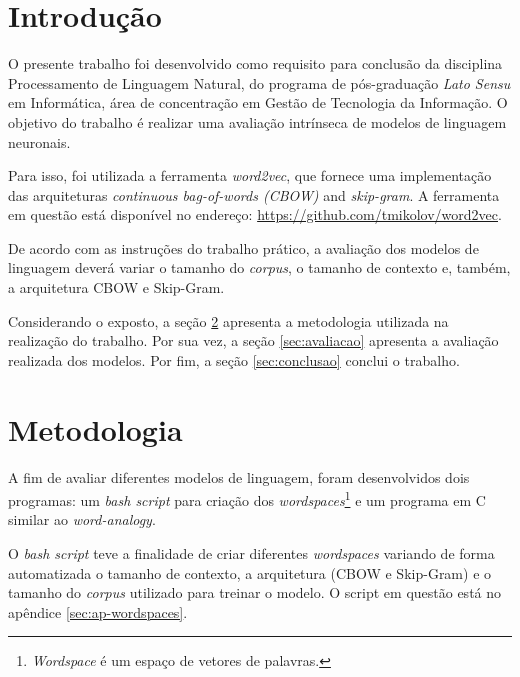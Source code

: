 \documentclass[12pt,openright,twoside,a4paper,article,brazil]{abntex2}
\begin{document}
\frontmatter


\maketitle

\tableofcontents

\newpage

\mainmatter



\section{Introdução}
\label{sec:introducao}

O presente trabalho foi desenvolvido como requisito para conclusão da disciplina Processamento de Linguagem Natural, do programa de pós-graduação \emph{Lato Sensu} em Informática, área de concentração em Gestão de Tecnologia da Informação. O objetivo do trabalho é realizar uma avaliação intrínseca de modelos de linguagem neuronais.

Para isso, foi utilizada a ferramenta \emph{word2vec}, que fornece uma implementação das arquiteturas \emph{continuous bag-of-words (CBOW)} and \emph{skip-gram}. A ferramenta em questão está disponível no endereço: \url{https://github.com/tmikolov/word2vec}.

De acordo com as instruções do trabalho prático, a avaliação dos modelos de linguagem deverá variar o tamanho do \emph{corpus}, o tamanho de contexto e, também, a arquitetura CBOW e \mbox{Skip-Gram}.

Considerando o exposto, a seção \ref{sec:metodologia} apresenta a metodologia utilizada na realização do trabalho. Por sua vez, a seção \ref{sec:avaliacao} apresenta a avaliação realizada dos modelos. Por fim, a seção \ref{sec:conclusao} conclui o trabalho.



\section{Metodologia}
\label{sec:metodologia}

A fim de avaliar diferentes modelos de linguagem, foram desenvolvidos dois programas: um \emph{bash script} para criação dos \emph{wordspaces}\footnote{\emph{Wordspace} é um espaço de vetores de palavras.} e um programa em C similar ao \emph{word-analogy}.

O \emph{bash script} teve a finalidade de criar diferentes \emph{wordspaces} variando de forma automatizada o tamanho de contexto, a arquitetura (CBOW e Skip-Gram) e o tamanho do \emph{corpus} utilizado para treinar o modelo. O script em questão está no apêndice \ref{sec:ap-wordspaces}.
\end{document}
